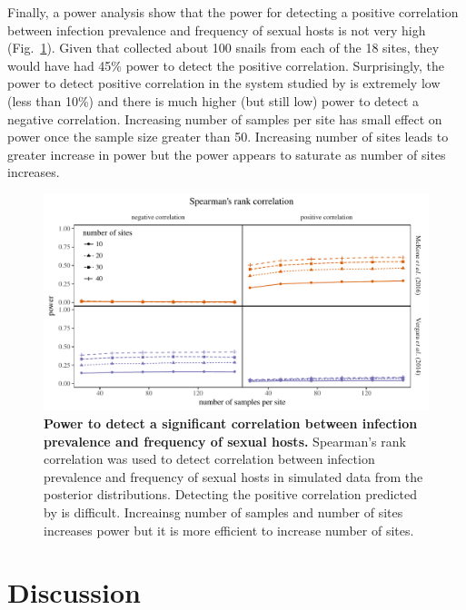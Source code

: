 \documentclass{article}\usepackage[]{graphicx}\usepackage[]{color}
\newcommand{\fref}[1]{Fig.~\ref{fig:#1}}
\begin{document}
Finally, a power analysis show that the power for detecting a positive correlation between infection prevalence and frequency of sexual hosts is not very high (\fref{power}).
Given that \cite{mckone2016fine} collected about 100 snails from each of the 18 sites, they would have had 45\% power to detect the positive correlation.
Surprisingly, the power to detect positive correlation in the system studied by \cite{vergara2014infection} is extremely low (less than 10\%) and there is much higher (but still low) power to detect a negative correlation.
Increasing number of samples per site has small effect on power once the sample size greater than 50.
Increasing number of sites leads to greater increase in power but the power appears to saturate as number of sites increases.

\begin{figure}[!htp]
\includegraphics[width=\textwidth]{../fig/power.pdf}
\caption{{\bf Power to detect a significant correlation between infection prevalence and frequency of sexual hosts.}
Spearman's rank correlation was used to detect correlation between infection prevalence and frequency of sexual hosts in simulated data from the posterior distributions. Detecting the positive correlation predicted by \cite{lively2001trematode} is difficult. Increainsg number of samples and number of sites increases power but it is more efficient to increase number of sites.}
\label{fig:power}
\end{figure}

\section{Discussion}
\end{document}
